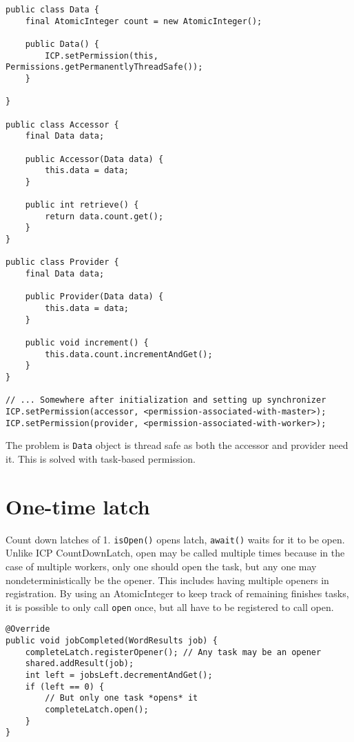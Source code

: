 \documentclass[9pt, twoside, a4paper]{article}
\begin{document}
    \begin{lstlisting}
public class Data {
    final AtomicInteger count = new AtomicInteger();

    public Data() {
        ICP.setPermission(this, Permissions.getPermanentlyThreadSafe());
    }

}

public class Accessor {
    final Data data;

    public Accessor(Data data) {
        this.data = data;
    }

    public int retrieve() {
        return data.count.get();
    }
}

public class Provider {
    final Data data;

    public Provider(Data data) {
        this.data = data;
    }

    public void increment() {
        this.data.count.incrementAndGet();
    }
}

// ... Somewhere after initialization and setting up synchronizer
ICP.setPermission(accessor, <permission-associated-with-master>);
ICP.setPermission(provider, <permission-associated-with-worker>);
    \end{lstlisting}

    The problem is \lstinline{Data} object is thread safe as both the accessor and provider need it.
    This is solved with task-based permission.

    \section{One-time latch}
    Count down latches of 1. \lstinline{isOpen()} opens latch, \lstinline{await()} waits for it to
    be open. Unlike ICP CountDownLatch, open may be called multiple times because in the case of multiple
    workers, only one should open the task, but any one may nondeterministically be the opener. This includes
    having multiple openers in registration. By using an AtomicInteger to keep track of remaining finishes tasks,
    it is possible to only call \lstinline{open} once, but all have to be registered to call open.

    \begin{lstlisting}[caption=Multiple openers, label=lst:multOpeners]
@Override
public void jobCompleted(WordResults job) {
    completeLatch.registerOpener(); // Any task may be an opener
    shared.addResult(job);
    int left = jobsLeft.decrementAndGet();
    if (left == 0) {
        // But only one task *opens* it
        completeLatch.open();
    }
}
    \end{lstlisting}
\end{document}

